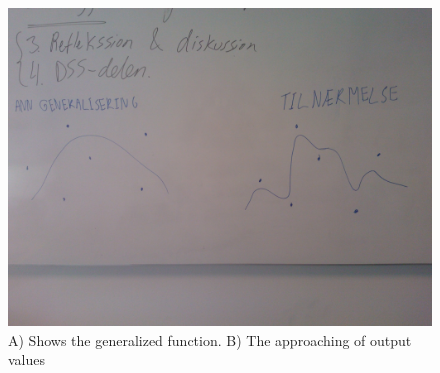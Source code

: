 \begin{figure}[H]
\centering
\includegraphics[width=0.99\linewidth,natwidth=898,natheight=587]{billeder/WP_000057.jpg}
\caption{A) Shows the generalized function. B) The approaching of output values}
\label{fig:WP}
\end{figure}
